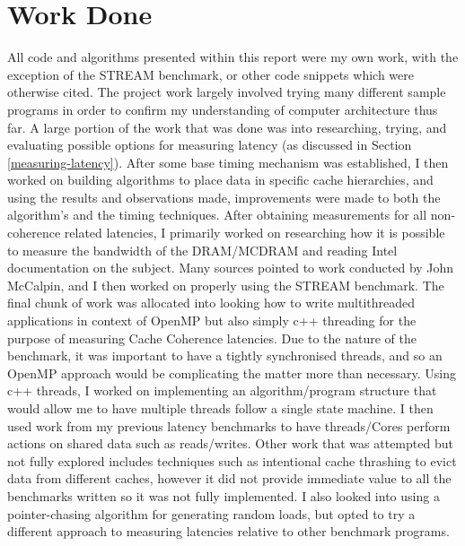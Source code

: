 \documentclass[bsc,frontabs,twoside,singlespacing,parskip,deptreport]{infthesis}     %
\begin{document}
\section{Work Done}
All code and algorithms presented within this report were my own work, with the exception of the STREAM benchmark, or other code snippets which were otherwise cited. The project work largely involved trying many different sample programs in order to confirm my understanding of computer architecture thus far. A large portion of the work that was done was into researching, trying, and evaluating possible options for measuring latency (as discussed in Section \ref{measuring-latency}). After some base timing mechanism was established, I then worked on building algorithms to place data in specific cache hierarchies, and using the results and observations made, improvements were made to both the algorithm's and the timing techniques. After obtaining measurements for all non-coherence related latencies, I primarily worked on researching how it is possible to measure the bandwidth of the DRAM/MCDRAM and reading Intel documentation on the subject. Many sources pointed to work conducted by John McCalpin, and I then worked on properly using the STREAM benchmark. The final chunk of work was allocated into looking how to write multithreaded applications in context of OpenMP but also simply c++ threading for the purpose of measuring Cache Coherence latencies. Due to the nature of the benchmark, it was important to have a tightly synchronised threads, and so an OpenMP approach would be complicating the matter more than necessary. Using c++ threads, I worked on implementing an algorithm/program structure that would allow me to have multiple threads follow a single state machine. I then used work from my previous latency benchmarks to have threads/Cores perform actions on shared data such as reads/writes. Other work that was attempted but not fully explored includes techniques such as intentional cache thrashing to evict data from different caches, however it did not provide immediate value to all the benchmarks written so it was not fully implemented. I also looked into using a pointer-chasing algorithm for generating random loads, but opted to try a different approach to measuring latencies relative to other benchmark programs. 
\end{document}
